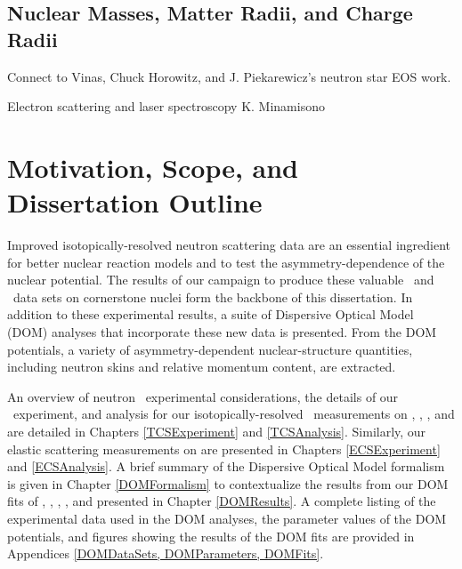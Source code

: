 \subsection{Nuclear Masses, Matter Radii, and Charge Radii}
Connect to Vinas, Chuck Horowitz, and J. Piekarewicz's neutron star EOS work.

Electron scattering and laser spectroscopy
K. Minamisono

\section{Motivation, Scope, and Dissertation Outline}
Improved isotopically-resolved neutron scattering data are an essential ingredient
for better nuclear reaction models and to test the asymmetry-dependence of the
nuclear potential. The results of our campaign to produce these valuable
\tot\ and \el\ data sets on cornerstone nuclei form the backbone of this dissertation.
In addition to these experimental results, a suite of Dispersive Optical Model (DOM) analyses that 
incorporate these new data is presented. From the DOM potentials, a variety of asymmetry-dependent 
nuclear-structure quantities, including neutron skins and relative momentum
content, are extracted.

An overview of neutron \tot\ experimental considerations, the details of our 
\tot\ experiment, and analysis for our isotopically-resolved \tot\ measurements
on \oSixEight, \niEightFour, \rhThree, and \snTwelveFour are detailed in 
Chapters \ref{TCSExperiment} and \ref{TCSAnalysis}. Similarly, our elastic scattering measurements 
on \snTwelveFour are presented in Chapters \ref{ECSExperiment} and \ref{ECSAnalysis}. A brief 
summary of the Dispersive Optical Model formalism is
given in Chapter \ref{DOMFormalism} to contextualize the results from our DOM fits of \oSixEight, 
\caAughtEight, \niEightFour, \snTwelveFour, and \pbEight presented in Chapter \ref{DOMResults}. 
A complete listing of the experimental data used in the DOM analyses, the
parameter values of the DOM potentials, and figures showing the 
results of the DOM fits are provided in Appendices \ref{DOMDataSets,
DOMParameters, DOMFits}. 
